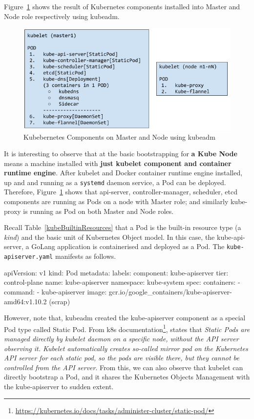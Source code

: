 \noindent Figure~\ref{fig:kubeadm} shows the result of Kubernetes components installed into Master and Node role respectively using kubeadm. 

\begin{figure}[H]
\centering
\includegraphics[width=0.55\paperwidth]{Figures/KUBE_kubeadm}
\decoRule
\caption[Kubebernetes Components on Master and Node]{Kubebernetes Components on Master and Node using kubeadm}
\label{fig:kubeadm}
\end{figure}

\noindent It is interesting to observe that at the basic bootstrapping for \textbf{a Kube Node} means a machine installed with \textbf{just kubelet component and container runtime engine}. After kubelet and Docker container runtime engine installed, up and and running as a \verb|systemd| daemon service, a Pod can be deployed. Therefore, Figure~\ref{fig:kubeadm} shows that api-server, controller-manager, scheduler, etcd components are running as Pods on a node with Master role; and similarly kube-proxy is running as Pod on both Master and Node roles.

Recall Table~\ref{kubeBuiltinResources} that a Pod is the built-in resource type (a \emph{kind}) and the basic unit of Kubernetes Object model. In this case, the kube-api-server, a GoLang application is containerised and deployed as a Pod. The \verb|kube-apiserver.yaml| manifests as follows.

\begin{lcverbatim}
apiVersion: v1
kind: Pod
metadata:
  labels:
    component: kube-apiserver
    tier: control-plane
  name: kube-apiserver
  namespace: kube-system
spec:
  containers:
  - command:
    - kube-apiserver
    image: gcr.io/google_containers/kube-apiserver-amd64:v1.10.2
    (scrap)
\end{lcverbatim}

However, note that, kubeadm created the kube-apiserver component as a special Pod type called Static Pod. From k8s documentation\footnote{\url{https://kubernetes.io/docs/tasks/administer-cluster/static-pod/}}, \parencite{kubeDoc} states that \emph{Static Pods are managed directly by kubelet daemon on a specific node, without the API server observing it. Kubelet automatically creates so-called mirror pod on the Kubernetes API server for each static pod, so the pods are visible there, but they cannot be controlled from the API server}. From this, we can also observe that kubelet can directly bootstrap a Pod, and it shares the Kubernetes Objects Management with the kube-apiserver to sudden extent.

